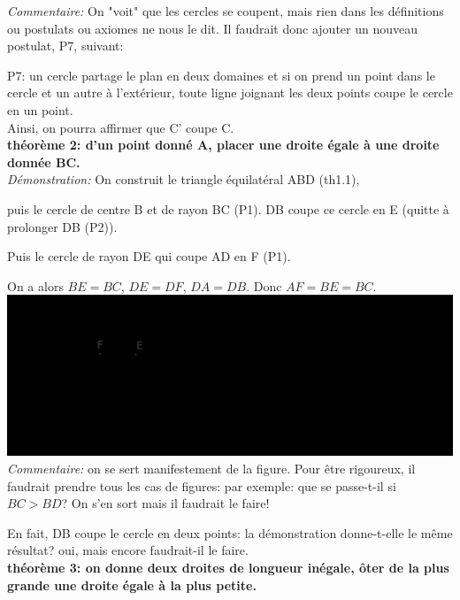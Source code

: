 \documentclass[a4paper, 12pt, twoside]{book}
\begin{document}
\textit{Commentaire:} On "voit" que les cercles se coupent, mais rien dans les définitions ou postulats ou axiomes ne nous le dit. Il faudrait    donc ajouter un nouveau postulat, P7, suivant:\

P7: un cercle partage le plan en deux domaines et si on prend un point dans le cercle et un autre à l'extérieur, toute ligne joignant les deux points coupe le cercle en un point.\\

Ainsi, on pourra affirmer que C' coupe C.\\

\textbf{théorème 2: d'un point donné A, placer une droite égale à une droite donnée BC.}\\

\textit{Démonstration:} On construit le triangle équilatéral ABD (th1.1),\

 puis le cercle de centre B et de rayon BC (P1). DB coupe ce cercle en E (quitte à prolonger DB (P2)).\

 Puis le cercle de rayon DE qui coupe AD en F (P1).\
 
  On a alors $BE=BC$, $DE=DF$, $DA=DB$. Donc $AF=BE=BC$.\\
 
 

\includegraphics[scale=0.3]{figures/th2.eps}\\

\textit{Commentaire:} on se sert manifestement de la figure. Pour être rigoureux, il faudrait prendre tous les cas de figures: par exemple: que se passe-t-il si $BC>BD$? On s'en sort mais il faudrait le faire!\

En fait, DB coupe le cercle en deux points: la démonstration donne-t-elle le même résultat? oui, mais encore faudrait-il le faire.\\

\textbf{théorème 3: on donne deux droites de longueur inégale, ôter de la plus grande une droite égale à la plus petite.}\\
\end{document}
